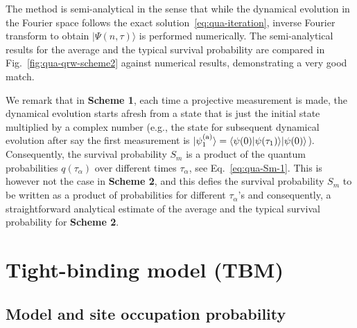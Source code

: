 \documentclass[12pt]{iopart}
\def\la{\langle}
\def\ra{\rangle}
\begin{document}
The method is semi-analytical in the sense that while the dynamical
evolution in the Fourier space follows the exact
solution~\eqref{eq:qua-iteration}, inverse Fourier transform to obtain
$|\Psi(n,\tau)\ra$ is performed numerically. 
The semi-analytical results for the average and the typical survival
probability are compared in Fig.~\ref{fig:qua-qrw-scheme2} against
numerical results, demonstrating a very good match. 

We remark that in {\bf Scheme 1}, each time a projective measurement is
made, the dynamical evolution starts afresh from a state that is just the initial state multiplied by a complex number
(e.g.,  the state for subsequent dynamical evolution after say the
first measurement is $|\psi^{({\rm a})}_1\ra= \la \psi(0)|\psi(\tau_1)\ra |\psi(0)\ra$).
Consequently,  the
survival probability $S_m$ is a product of the quantum probabilities 
$q(\tau_\alpha)$ over different times $\tau_\alpha$, see
Eq.~\eqref{eq:qua-Sm-1}.  This is however not the case in {\bf Scheme 2},  and this defies the survival probability $S_m$
to be written as a product of probabilities for different
$\tau_\alpha$'s and consequently, a straightforward analytical estimate
of the average and the typical survival probability for {\bf Scheme 2}.

\section{Tight-binding model (TBM)}
\label{sec:TBM}

\subsection{Model and site occupation probability}
\label{sec:TBM1}
\end{document}

